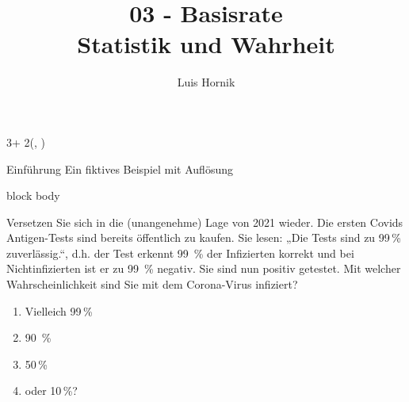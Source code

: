 \documentclass{beamer}
\title{03 - Basisrate \\
	\Large{Statistik und Wahrheit}}
\author{%
	Luis Hornik
}
\date{}
\newlength{\blockOne}
\begin{document}


\begin{frame}[t]	%





\TPshowboxestrue




\begin{textblock*}{3\colwidth + 2\colsep}(\leftmargin, \blockOne)

\begin{alertblock}{%
	\begin{minipage}[b]{60pt}
		\RaggedRight
		\noindent\hspace{-10pt}
	\end{minipage}%
	\begin{minipage}[b]{3\colwidth+2\colsep-125pt}\strut%
		Einführung \;
		{\mdseries Ein fiktives Beispiel mit Auflösung}
	\end{minipage}%
}
	\vspace{-0.25cm}
	\begin{minipage}{\textwidth}
		\begin{beamercolorbox}[
			ht = 24.5cm, 
			wd = \linewidth, 
			left
		]{block body}

			\begin{center}
		Versetzen Sie sich in die (unangenehme) Lage von 2021 wieder. Die ersten Covids Antigen-Tests sind bereits öffentlich zu kaufen. Sie lesen: „Die Tests sind zu 99\,\% zuverlässig.“, d.h. der Test erkennt 99 \,\% der Infizierten korrekt und bei Nichtinfizierten ist er zu 99 \,\% negativ. Sie sind nun positiv getestet. Mit welcher Wahrscheinlichkeit sind Sie mit dem Corona-Virus infiziert?
			\begin{enumerate}
 			\item Vielleich 99\,\%
  			\item 90 \,\%
  			\item 50\,\%
  			\item oder 10\,\%?
			\end{enumerate}
			\end{center}


\end{beamercolorbox}
\end{minipage}
\end{alertblock}
\end{textblock*}
\end{frame}
\end{document}
